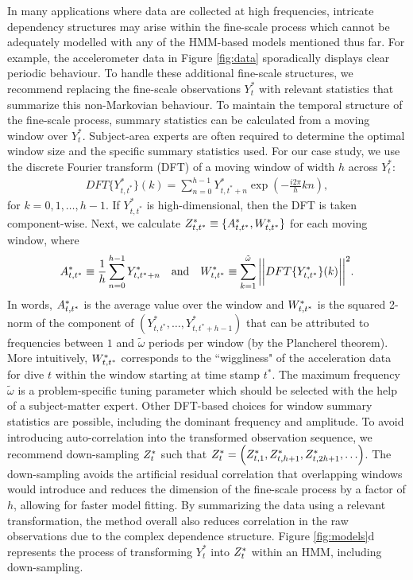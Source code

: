In many applications where data are collected at high frequencies, intricate dependency structures may arise within the fine-scale process which cannot be adequately modelled with any of the HMM-based models mentioned thus far. For example, the accelerometer data in Figure \ref{fig:data} sporadically displays clear periodic behaviour. To handle these additional fine-scale structures, we recommend replacing the fine-scale observations $Y_t^*$ with relevant statistics that summarize this non-Markovian behaviour. To maintain the temporal structure of the fine-scale process, summary statistics can be calculated from a moving window over $Y_t^*$. Subject-area experts are often required to determine the optimal window size and the specific summary statistics used. For our case study, we use the discrete Fourier transform (DFT) of a moving window of width $h$ across $Y^*_t$:
%
\begin{align*}
    DFT\{Y^*_{t,t^*}\}(k) = \sum_{n=0}^{h-1} Y^*_{t,t^*+n}\exp\left(-\frac{i 2\pi}{h} kn \right),
\end{align*}
%
for $k = 0, 1, \ldots, h-1$. If $Y^*_{t,t^*}$ is high-dimensional, then the DFT is taken component-wise. Next, we calculate $Z^*_{t,t^*} \equiv \{A^*_{t,t^*},W^*_{t,t^*}\}$ for each moving window, where
%
\begin{equation}
    \label{eqn:z}
    \Zone_{t,t^*} \equiv \frac{1}{h}\sum_{n=0}^{h-1}Y^*_{t,t^*+n} \quad \text{and} \quad \Ztwo_{t,t^*} \equiv \sum_{k=1}^{\tilde{\omega}}\bigg|\bigg|DFT\{Y^*_{t,t^*}\}(k)\bigg|\bigg|^2.
\end{equation}
%
In words, $A^*_{t,t^*}$ is the average value over the window and $W^*_{t,t^*}$ is the squared 2-norm of the component of $\left(Y^*_{t,t^*}, \ldots, Y^*_{t,t^*+h-1}\right)$ that can be attributed to frequencies between $1$ and $\tilde{\omega}$ periods per window (by the Plancherel theorem). More intuitively, $W^*_{t,t^*}$ corresponds to the ``wiggliness" of the acceleration data for dive $t$ within the window starting at time stamp $t^*$. The maximum frequency $\tilde{\omega}$ is a problem-specific tuning parameter which should be selected with the help of a subject-matter expert. Other DFT-based choices for window summary statistics are possible, including the dominant frequency and amplitude. To avoid introducing auto-correlation into the transformed observation sequence, we recommend down-sampling $Z^*_t$ such that $Z^*_t = \left(Z^*_{t,1},Z^*_{t,h+1},Z^*_{t,2h+1},\ldots\right)$. The down-sampling avoids the artificial residual correlation that overlapping windows would introduce and reduces the dimension of the fine-scale process by a factor of $h$, allowing for faster model fitting. By summarizing the data using a relevant transformation, the method overall also reduces correlation in the raw observations due to the complex dependence structure. Figure \ref{fig:models}d represents the process of transforming $Y^*_{t}$ into $Z^*_{t}$ within an HMM, including down-sampling.


